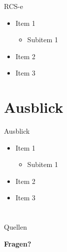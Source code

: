 \documentclass{beamer}
\begin{document}
\begin{frame}{RCS-e}
	\begin{itemize}
		\item Item 1
		\begin{itemize}
			\item Subitem 1
		\end{itemize}
		\item Item 2
		\item Item 3
	\end{itemize}
\end{frame}

\section{Ausblick}
\begin{frame}{Ausblick}
	\begin{itemize}
		\item Item 1
		\begin{itemize}
			\item Subitem 1
		\end{itemize}
		\item Item 2
		\item Item 3
	\end{itemize}
\end{frame}


\section{}

\begin{frame}{Quellen}	
	\scriptsize{
		\nocite{author1:title1,author1:title2}
		
	}
\end{frame}


\begin{frame}
	\begin{center}
	\Huge{\textbf{Fragen?}}
	\end{center}
\end{frame}
\end{document}
